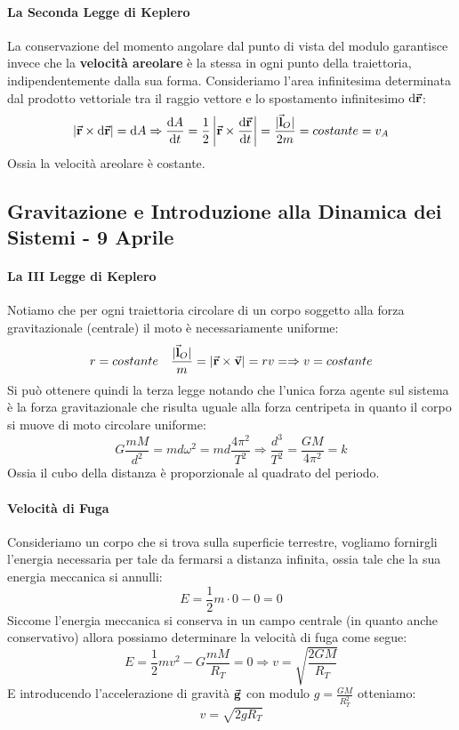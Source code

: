 \documentclass{article}
\newcommand{\then}{\ensuremath{\Rightarrow}}
\renewcommand{\v}{\va{v}}
\renewcommand{\r}{\va{r}}
\newcommand{\g}{\va{g}}
\renewcommand{\l}{\va{l}}
\begin{document}
\paragraph{La Seconda Legge di Keplero}
La conservazione del momento angolare dal punto di vista del modulo garantisce invece che la \textbf{velocità areolare} è la stessa in ogni punto della traiettoria, indipendentemente dalla sua forma. Consideriamo l'area infinitesima determinata dal prodotto vettoriale tra il raggio vettore e lo spostamento infinitesimo $\dd\r$:
\begin{equation}
|\r\times\dd\r|=\dd A\then \dv{A}{t}=\frac{1}{2}\left|\r\times\dv{\r}{t}\right|=\frac{|\l_O|}{2m}=costante=v_A
\end{equation}
Ossia la velocità areolare è costante.
\subsection{Gravitazione e Introduzione alla Dinamica dei Sistemi - 9 Aprile}
\paragraph{La III Legge di Keplero}
Notiamo che per ogni traiettoria circolare di un corpo soggetto alla forza gravitazionale (centrale) il moto è necessariamente uniforme:
\[r=costante\quad \frac{|\l_O|}{m}=|\r\times\v|=rv=\then v=costante\]
Si può ottenere quindi la terza legge notando che l'unica forza agente sul sistema è la forza gravitazionale che risulta uguale alla forza centripeta in quanto il corpo si muove di moto circolare uniforme:
\[G\frac{mM}{d^2}=md\omega^2=md\frac{4\pi^2}{T^2}\then \frac{d^3}{T^2}=\frac{GM}{4\pi^2}=k \]
Ossia il cubo della distanza è proporzionale al quadrato del periodo.
\paragraph{Velocità di Fuga}
Consideriamo un corpo che si trova sulla superficie terrestre, vogliamo fornirgli l'energia necessaria per tale da fermarsi a distanza infinita, ossia tale che la sua energia meccanica si annulli:
\[E=\frac{1}{2}m\cdot0-0=0\]
Siccome l'energia meccanica si conserva in un campo centrale (in quanto anche conservativo) allora possiamo determinare la velocità di fuga come segue:
\begin{equation}
    E=\frac{1}{2}mv^2-G\frac{mM}{R_T}=0\then \boxed{v=\sqrt{\frac{2GM}{R_T}}}
\end{equation}
E introducendo l'accelerazione di gravità $\g$ con modulo $g=\frac{GM}{R_T^2}$ otteniamo:
\begin{equation}
    \boxed{v=\sqrt{2gR_T}}
\end{equation}
\end{document}
